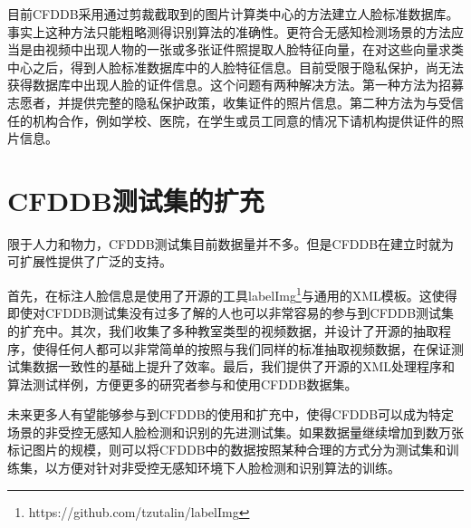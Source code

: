 目前CFDDB采用通过剪裁截取到的图片计算类中心的方法建立人脸标准数据库。事实上这种方法只能粗略测得识别算法的准确性。更符合无感知检测场景的方法应当是由视频中出现人物的一张或多张证件照提取人脸特征向量，在对这些向量求类中心之后，得到人脸标准数据库中的人脸特征信息。目前受限于隐私保护，尚无法获得数据库中出现人脸的证件信息。这个问题有两种解决方法。第一种方法为招募志愿者，并提供完整的隐私保护政策，收集证件的照片信息。第二种方法为与受信任的机构合作，例如学校、医院，在学生或员工同意的情况下请机构提供证件的照片信息。

\section{CFDDB测试集的扩充}

限于人力和物力，CFDDB测试集目前数据量并不多。但是CFDDB在建立时就为可扩展性提供了广泛的支持。

首先，在标注人脸信息是使用了开源的工具labelImg\footnote{https://github.com/tzutalin/labelImg}与通用的XML模板。这使得即使对CFDDB测试集没有过多了解的人也可以非常容易的参与到CFDDB测试集的扩充中。其次，我们收集了多种教室类型的视频数据，并设计了开源的抽取程序，使得任何人都可以非常简单的按照与我们同样的标准抽取视频数据，在保证测试集数据一致性的基础上提升了效率。最后，我们提供了开源的XML处理程序和算法测试样例，方便更多的研究者参与和使用CFDDB数据集。

未来更多人有望能够参与到CFDDB的使用和扩充中，使得CFDDB可以成为特定场景的非受控无感知人脸检测和识别的先进测试集。如果数据量继续增加到数万张标记图片的规模，则可以将CFDDB中的数据按照某种合理的方式分为测试集和训练集，以方便对针对非受控无感知环境下人脸检测和识别算法的训练。
